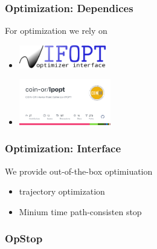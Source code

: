 \begin{frame}[t]
	\frametitle{Optimization: Dependices}

	For optimization we rely on
	\begin{itemize}
		\item \includegraphics[height=1cm]{images/ifopt.png}
		\item \includegraphics[height=2cm]{images/Ipopt.png}
	\end{itemize}
\end{frame}

\begin{frame}[t]
	\frametitle{Optimization: Interface}

	We provide out-of-the-box optimiuation
	\begin{itemize}
		\item trajectory optimization
		\item Minium time path-consisten stop
	\end{itemize}
\end{frame}

\begin{frame}[fragile]
	\frametitle{OpStop}
\end{frame}
